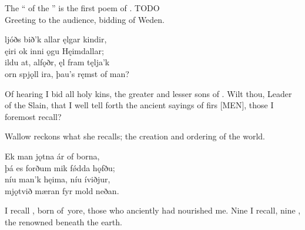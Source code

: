 \bookStart


\small{The “ of the ” is the first poem of \Regius. TODO} \\

\small{Greeting to the audience, bidding of Weden.}

\bva {}ljóðs bið’k allar \hld {}ęlgar kindir, \\%
ęiri ok inni \hld {}ǫgu Hęimdallar; \\%
ildu at, alfǫðr, \hld {}ęl fram tęlja’k \\%
orn spjǫll ira, \hld þau’s ręmst of man?\eva

\bvb Of hearing I bid all holy kins\footnotemark[1], the greater and lesser sons of \footnotemark[2]. Wilt thou, Leader of the Slain\footnotemark[3], that I well tell forth the ancient sayings of firs [MEN], those I foremost recall?\footnotemark[4]\evb
{}

\small{Wallow reckons what she recalls; the creation and ordering of the world.}

\bva Ek man jǫtna \hld ár of borna, \\%
þá es forðum \hld mik fǿdda hǫfðu; \\%
níu man’k hęima, \hld níu íviðjur\footnotemark[1], \\%
mjǫtvið mæran \hld fyr mold neðan.\eva
{}

\bvb I recall , born of yore, those who anciently had nourished me. Nine  I recall, nine , the renowned  beneath the earth\footnotemark[1].\evb
{}

